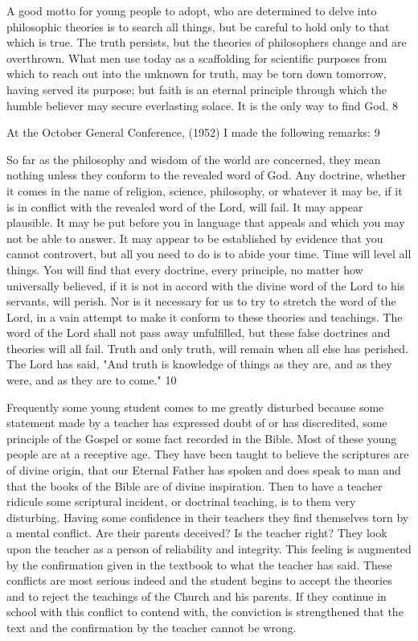 A good motto for young people to adopt, who are determined to delve into philosophic
theories is to search all things, but be careful to hold only to that which is true. The truth
persists, but the theories of philosophers change and are overthrown. What men use today as
a scaffolding for scientific purposes from which to reach out into the unknown for truth, may
be torn down tomorrow, having served its purpose; but faith is an eternal principle through
which the humble believer may secure everlasting solace. It is the only way to find God. 8

At the October General Conference, (1952) I made the following remarks: 9

So far as the philosophy and wisdom of the world are concerned, they mean nothing unless
they conform to the revealed word of God. Any doctrine, whether it comes in the name of
religion, science, philosophy, or whatever it may be, if it is in conflict with the revealed word
of the Lord, will fail. It may appear plausible. It may be put before you in language that
appeals and which you may not be able to answer. It may appear to be established by
evidence that you cannot controvert, but all you need to do is to abide your time. Time will
level all things. You will find that every doctrine, every principle, no matter how universally
believed, if it is not in accord with the divine word of the Lord to his servants, will perish.
Nor is it necessary for us to try to stretch the word of the Lord, in a vain attempt to make it
conform to these theories and teachings. The word of the Lord shall not pass away
unfulfilled, but these false doctrines and theories will all fail. Truth and only truth, will
remain when all else has perished. The Lord has said, "And truth is knowledge of things as
they are, and as they were, and as they are to come." 10

Frequently some young student comes to me greatly disturbed because some statement made
by a teacher has expressed doubt of or has discredited, some principle of the Gospel or some
fact recorded in the Bible. Most of these young people are at a receptive age. They have been
taught to believe the scriptures are of divine origin, that our Eternal Father has spoken and
does speak to man and that the books of the Bible are of divine inspiration. Then to have a
teacher ridicule some scriptural incident, or doctrinal teaching, is to them very disturbing.
Having some confidence in their teachers they find themselves torn by a mental conflict. Are
their parents deceived? Is the teacher right? They look upon the teacher as a person of
reliability and integrity. This feeling is augmented by the confirmation given in the textbook
to what the teacher has said. These conflicts are most serious indeed and the student begins to
accept the theories and to reject the teachings of the Church and his parents. If they continue
in school with this conflict to contend with, the conviction is strengthened that the text and
the confirmation by the teacher cannot be wrong.

